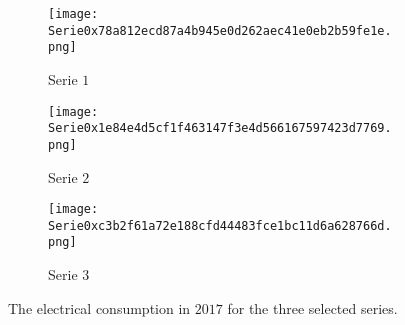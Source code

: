 \begin{figure}[ht]
	\begin{subfigure}{0.32\textwidth}
		\texttt{[image: Serie0x78a812ecd87a4b945e0d262aec41e0eb2b59fe1e.png]}
		\caption{Serie $ 1 $}
	\end{subfigure}	 	
	\begin{subfigure}{0.32\textwidth}
		\texttt{[image: Serie0x1e84e4d5cf1f463147f3e4d566167597423d7769.png]}
		\caption{Serie $ 2 $}
	\end{subfigure}	
	\begin{subfigure}{0.32\textwidth}
		\texttt{[image: Serie0xc3b2f61a72e188cfd44483fce1bc11d6a628766d.png]}
		\caption{Serie $ 3 $}
	\end{subfigure}
	\caption{The electrical consumption in $ 2017 $ for the three selected series. }
	\label{fig:three_series}
\end{figure}


